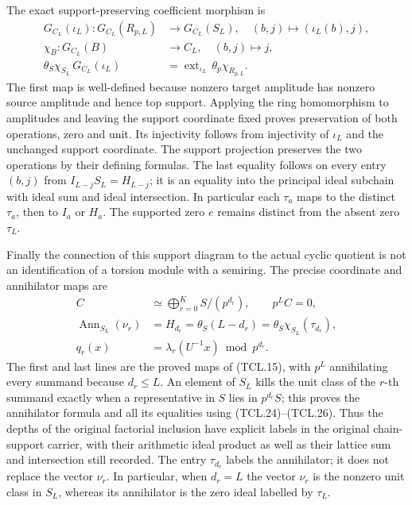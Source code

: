 The exact support-preserving coefficient morphism is
\[
 \begin{split}
 G_{C_L}(\iota_L):G_{C_L}(R_{p,L})&\longrightarrow G_{C_L}(S_L),
           \quad (b,j)\longmapsto(\iota_L(b),j),\\
 \chi_B:G_{C_L}(B)&\longrightarrow C_L,
           \quad(b,j)\longmapsto j,\\
 \theta_S\chi_{S_L}\,G_{C_L}(\iota_L)
    &=\operatorname{ext}_{\iota_L}\,\theta_p\chi_{R_{p,L}}.
 \end{split}
 \tag{TCL.26}\label{CFStage:eq:tcl-support-map}
\]
The first map is well-defined because nonzero target amplitude
has nonzero source amplitude and hence top support. Applying the
ring homomorphism to amplitudes and leaving the support coordinate
fixed proves preservation of both operations, zero and unit.
Its injectivity follows from injectivity of \(\iota_L\) and
the unchanged support coordinate. The support projection preserves
the two operations by their defining formulas. The last equality
follows on every entry \((b,j)\) from
\(I_{L-j}S_L=H_{L-j}\); it is an equality into the principal
ideal subchain with ideal sum and ideal intersection. In particular
each \(\tau_a\) maps to the distinct \(\tau_a\), then to
\(I_a\) or \(H_a\). The supported zero \(e\) remains distinct
from the absent zero \(\tau_L\).

Finally the connection of this support diagram to the actual cyclic
quotient is not an identification of a torsion module with a semiring.
The precise coordinate and annihilator maps are
\[
 \begin{split}
 C&\simeq\bigoplus_{r=0}^K S/(p^{d_r}),\qquad p^L C=0,\\
 \operatorname{Ann}_{S_L}(\nu_r)&=H_{d_r}
     =\theta_S(L-d_r)
     =\theta_S\chi_{S_L}(\tau_{d_r}),\\
 q_r(x)&=\lambda_r(U^{-1}x)\bmod p^{d_r}.
 \end{split}
 \tag{TCL.27}\label{CFStage:eq:tcl-quotient-support}
\]
The first and last lines are the proved maps of (TCL.15), with
\(p^L\) annihilating every summand because \(d_r\leq L\).
An element of \(S_L\) kills the unit class of the \(r\)-th
summand exactly when a representative in \(S\) lies in
\(p^{d_r}S\); this proves the annihilator formula and all its
equalities using (TCL.24)--(TCL.26). Thus the depths of the
original factorial inclusion have explicit labels in the original
chain-support carrier, with their arithmetic ideal product as well
as their lattice sum and intersection still recorded.
The entry \(\tau_{d_r}\) labels the annihilator; it does not
replace the vector \(\nu_r\). In particular, when \(d_r=L\)
the vector \(\nu_r\) is the nonzero unit class in \(S_L\), whereas
its annihilator is the zero ideal labelled by \(\tau_L\).

